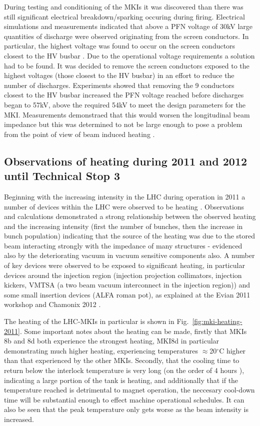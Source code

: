 During testing and conditioning of the MKIs it was discovered than there was still significant electrical breakdown/sparking occuring during firing. Electrical simulations and measurements indicated that above a PFN voltage of 30kV large quantities of discharge were observed originating from the screen conductors. In particular, the highest voltage was found to occur on the screen conductors closest to the HV busbar \cite{Barnes:improvBeamScreen}. Due to the operational voltage requirements a solution had to be found. It was decided to remove the screen conductors exposed to the highest voltages (those closest to the HV busbar) in an effort to reduce the number of discharges. Experiments showed that removing the 9 conductors closest to the HV busbar increased the PFN voltage reached before discharges began to 57kV, above the required 54kV to meet the design parameters for the MKI. Measurements demonstraed that this would worsen the longitudinal beam impedance but this was determined to not be large enough to pose a problem from the point of view of beam induced heating \cite{Barnes:improvBeamScreen}.

\subsection{Observations of heating during 2011 and 2012 until Technical Stop 3}

Beginning with the increasing intensity in the LHC during operation in 2011 a number of devices within the LHC were observed to be heating \cite{Métral:Heating, Salvant:Heating}. Observations and calculations demonstrated a strong relationship between the observed heating and the increasing intensity (first the number of bunches, then the increase in bunch population) indicating that the source of the heating was due to the stored beam interacting strongly with the impedance of many structures - evidenced also by the deteriorating vacuum in vacuum sensitive components also. A number of key devices were observed to be exposed to significant heating, in particular devices around the injection region (injection projection collimators, injection kickers, VMTSA (a two beam vacuum interconnect in the injection region)) and some small insertion devices (ALFA roman pot), as explained at the Evian 2011 workshop \cite{Salvant:Heating} and Chamonix 2012 \cite{Métral:Heating}. 

The heating of the LHC-MKIs in particular is shown in Fig.~\ref{fig:mki-heating-2011}. Some important notes about the heating can be made, firstly that MKIs 8b and 8d both experience the strongest heating, MKI8d in particular demonstrating much higher heating, experiencing temperatures $\approx$20$^{\circ}$C higher than that experienced by the other MKIs. Secondly, that the cooling time to return below the interlock temperature is very long (on the order of 4 hours \cite{Goddard:timeConst}), indicating a large portion of the tank is heating, and additionally that if the temperature reached is detrimental to magnet operation, the neccesary cool-down time will be substantial enough to effect machine operational schedules. It can also be seen that the peak temperature only gets worse as the beam intensity is increased.

